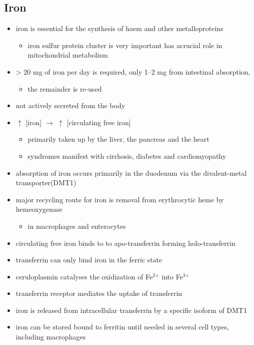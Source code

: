 \documentclass{scrartcl}
\begin{document}
\subsection{Iron}
\label{sec:orgb33e729}
\begin{itemize}
\item iron is essential for the synthesis of haem and other
metalloproteins
\begin{itemize}
\item iron sulfur protein cluster is very important has acrucial role in
mitochondrial metabolism
\end{itemize}
\item \textgreater{} 20 mg of iron per day is required, only 1–2 mg from intestinal absorption,
\begin{itemize}
\item the remainder is re-used
\end{itemize}
\item not actively secreted from the body
\item \(\uparrow\) [iron] \(\to\) \(\uparrow\) [circulating free iron]
\begin{itemize}
\item primarily taken up by the liver, the pancreas and the heart
\item syndromes manifest with cirrhosis, diabetes and cardiomyopathy
\end{itemize}
\item absorption of iron occurs primarily in the duodenum via the
divalent-metal transporter(DMT1)
\item major recycling route for iron is removal from erythrocytic heme by
hemeoxygenase
\begin{itemize}
\item in macrophages and enterocytes
\end{itemize}
\item circulating free iron binds to to apo-transferrin forming holo-transferrin
\item transferrin can only bind iron in the ferric state
\item ceruloplasmin catalyses the oxidization of Fe\(^{\text{2+}}\) into Fe\(^{\text{3+}}\)
\item transferrin receptor mediates the uptake of transferrin
\item iron is released from intracellular transferrin by a specific isoform of DMT1
\item iron can be stored bound to ferritin until needed in several cell
types, including macrophages
\end{itemize}
\end{document}
